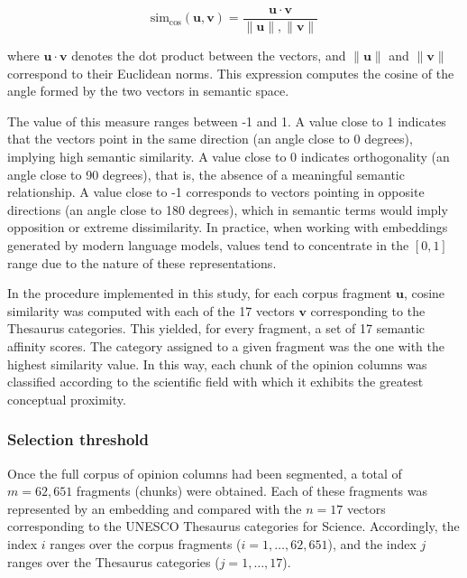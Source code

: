\documentclass[11pt,a4paper]{article}
\begin{document}
	\begin{equation}
		\text{sim}_{\cos}(\mathbf{u}, \mathbf{v}) =
		\frac{\mathbf{u} \cdot \mathbf{v}}
		{\lVert \mathbf{u} \rVert , \lVert \mathbf{v} \rVert}
	\end{equation}
		
	where $\mathbf{u} \cdot \mathbf{v}$ denotes the dot product between the vectors, and $\lVert \mathbf{u} \rVert$ and $\lVert \mathbf{v} \rVert$ correspond to their Euclidean norms. This expression computes the cosine of the angle formed by the two vectors in semantic space.
	
	The value of this measure ranges between -1 and 1. A value close to 1 indicates that the vectors point in the same direction (an angle close to 0 degrees), implying high semantic similarity. A value close to 0 indicates orthogonality (an angle close to 90 degrees), that is, the absence of a meaningful semantic relationship. A value close to -1 corresponds to vectors pointing in opposite directions (an angle close to 180 degrees), which in semantic terms would imply opposition or extreme dissimilarity. In practice, when working with embeddings generated by modern language models, values tend to concentrate in the $[0,1]$ range due to the nature of these representations.
		
	In the procedure implemented in this study, for each corpus fragment $\mathbf{u}$, cosine similarity was computed with each of the 17 vectors $\mathbf{v}$ corresponding to the Thesaurus categories. This yielded, for every fragment, a set of 17 semantic affinity scores. The category assigned to a given fragment was the one with the highest similarity value. In this way, each chunk of the opinion columns was classified according to the scientific field with which it exhibits the greatest conceptual proximity.
	

	\subsubsection{Selection threshold}

Once the full corpus of opinion columns had been segmented, a total of $m = 62{,}651$ fragments (chunks) were obtained. Each of these fragments was represented by an embedding and compared with the $n = 17$ vectors corresponding to the UNESCO Thesaurus categories for Science. Accordingly, the index $i$ ranges over the corpus fragments ($i = 1, \dots, 62{,}651$), and the index $j$ ranges over the Thesaurus categories ($j = 1, \dots, 17$).
\end{document}
